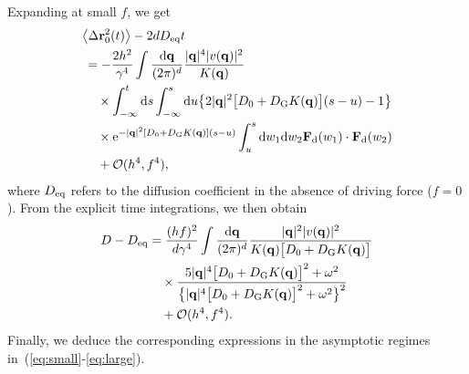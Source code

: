 \documentclass[superscriptaddress, twocolumn, prx, longbibliography, nofootinbib]{revtex4-1}
\begin{document}
Expanding at small $f$, we get
\begin{equation}
	\begin{aligned}
		&\big\langle\Delta{\bf r}^2_0(t)\big\rangle - 2 d D_{\rm eq} t
		\\
		&\,= - \frac{2h^2}{\gamma^4} \int \frac{{\rm d}{\bf q}}{(2\pi)^d} \frac{|{\bf q}|^4 |v({\bf q})|^2}{K({\bf q})}
		\\
		&\,\quad\times \int_{-\infty}^t{\rm d}s \int_{-\infty}^s{\rm d}u \big\{ 2|{\bf q}|^2\big[D_0+D_{\rm G}K({\bf q})\big](s-u) - 1\big\}
		\\
		&\,\quad\times {\rm e}^{ -|{\bf q}|^2[D_0+D_{\rm G}K({\bf q})](s-u)} \int_u^s {\rm d}w_1{\rm d}w_2 {\bf F}_{\rm d}(w_1)\cdot{\bf F}_{\rm d}(w_2)
		\\
		&\,\quad + {\cal O}(h^4,f^4) ,
	\end{aligned}
\end{equation}
where $D_{\rm eq}$ refers to the diffusion coefficient in the absence of driving force ($f=0$). From the explicit time integrations, we then obtain
\begin{equation}
	\begin{aligned}
		D - D_{\rm eq} &= \frac{(hf)^2}{d\gamma^4} \int \frac{{\rm d}{\bf q}}{(2\pi)^d} \frac{|{\bf q}|^2|v({\bf q})|^2}{K({\bf q})\big[D_0+D_{\rm G}K({\bf q})\big]}
		\\
		&\quad\times \frac{5|{\bf q}|^4\big[D_0+D_{\rm G}K({\bf q})\big]^2 + \omega^2}{ \big\{ |{\bf q}|^4\big[D_0+D_{\rm G}K({\bf q})\big]^2 + \omega^2 \big\}^2}
		\\
		&\quad + {\cal O}(h^4,f^4) .
	\end{aligned}
\end{equation}
Finally, we deduce the corresponding expressions in the asymptotic regimes in~(\ref{eq:small}-\ref{eq:large}).
\end{document}
